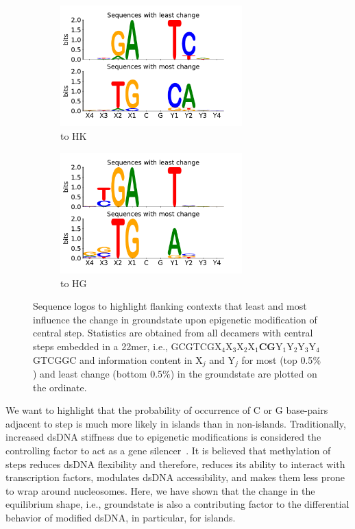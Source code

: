 \begin{figure}[H]
\begin{center}
  \begin{subfigure}{7cm}
    \centering\includegraphics[width=7cm]{images/epi_sensitivity_groundstate_seq_logo_HK_Mahal.pdf}
    \centering\caption{\cpg to HK}
  \end{subfigure}
  \begin{subfigure}{7cm}
    \centering\includegraphics[width=7cm]{images/epi_sensitivity_groundstate_seq_logo_HG_Mahal.pdf}
    \centering\caption{\cpg to HG}
  \end{subfigure}
\centering\caption{Sequence logos to highlight flanking contexts that least and most influence the change in groundstate upon epigenetic modification of central \cpg step. Statistics are obtained from all decamers with central \cpg steps embedded in a 22mer, i.e.,  GCGTCGX$_4$X$_3$X$_2$X$_1$\textbf{CG}Y$_1$Y$_2$Y$_3$Y$_4$GTCGGC and information content in X$_j$ and Y$_j$ for most (top 0.5$\%$) and least change (bottom 0.5$\%$) in the groundstate are plotted on the ordinate.
}
\label{c6:fig5_seq_logo_sens}
\end{center}
\end{figure}

We want to highlight that the probability of occurrence of C or G base-pairs adjacent to \cpg step is much more likely in \cpg islands than in non-\cpg islands.
Traditionally, increased dsDNA stiffness due to epigenetic modifications is considered the controlling factor to act as a gene silencer~\cite{cortini2016physics,perez2012impact,portella2013understanding}.
It is believed that methylation of \cpg steps reduces dsDNA flexibility and therefore, reduces its ability to interact with transcription factors, modulates dsDNA accessibility, and makes them less prone to wrap around nucleosomes.
Here, we have shown that the change in the equilibrium shape, i.e., groundstate is also a contributing factor to the differential behavior of modified dsDNA, in particular, for \cpg islands.



